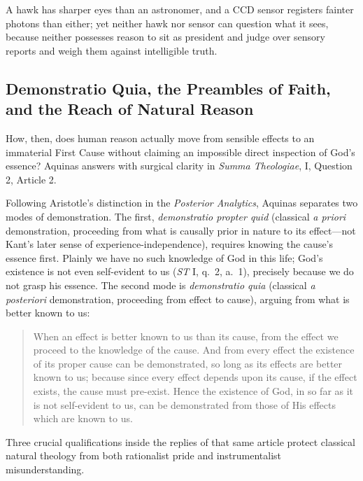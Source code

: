 A hawk has sharper eyes than an astronomer, and a CCD sensor registers fainter photons than either; yet neither hawk nor sensor can question what it sees, because neither possesses reason to sit as president and judge over sensory reports and weigh them against intelligible truth.

\subsection{Demonstratio Quia, the Preambles of Faith, and the Reach of Natural Reason}

How, then, does human reason actually move from sensible effects to an immaterial First Cause without claiming an impossible direct inspection of God's essence? Aquinas answers with surgical clarity in \emph{Summa Theologiae}, I, Question 2, Article 2.

Following Aristotle's distinction in the \emph{Posterior Analytics}, Aquinas separates two modes of demonstration. The first, \emph{demonstratio propter quid} (classical \emph{a priori} demonstration, proceeding from what is causally prior in nature to its effect---not Kant's later sense of experience-independence), requires knowing the cause's essence first. Plainly we have no such knowledge of God in this life; God's existence is not even self-evident to us (\emph{ST} I, q.\ 2, a.\ 1), precisely because we do not grasp his essence. The second mode is \emph{demonstratio quia} (classical \emph{a posteriori} demonstration, proceeding from effect to cause), arguing from what is better known to us:

\begin{quote}
When an effect is better known to us than its cause, from the effect we proceed to the knowledge of the cause. And from every effect the existence of its proper cause can be demonstrated, so long as its effects are better known to us; because since every effect depends upon its cause, if the effect exists, the cause must pre-exist. Hence the existence of God, in so far as it is not self-evident to us, can be demonstrated from those of His effects which are known to us.
\end{quote}

Three crucial qualifications inside the replies of that same article protect classical natural theology from both rationalist pride and instrumentalist misunderstanding.

